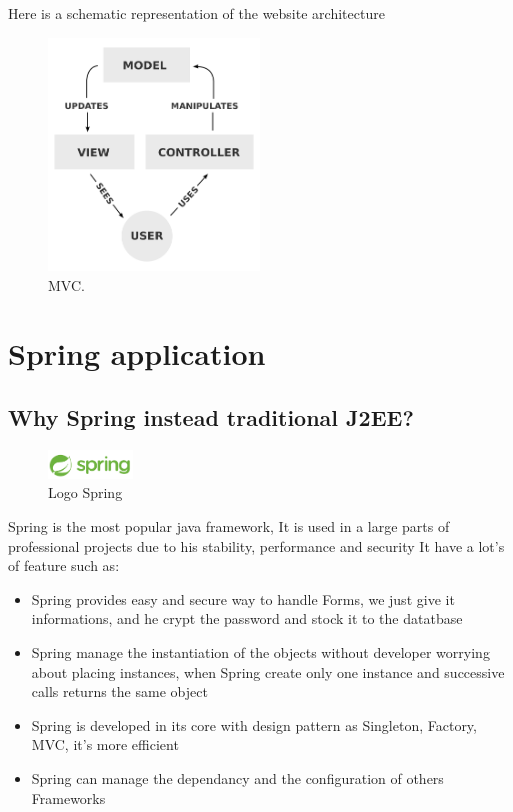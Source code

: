 Here is a schematic representation of the website architecture

\begin{figure}[!ht]
  \caption{MVC.}
  \centering
    \includegraphics[width=0.5\textwidth]{img/mvc.png}
\end{figure}


\section{Spring application}
\subsection{Why Spring instead traditional J2EE?}

\begin{figure}[H]
  \caption{Logo Spring}
  \centering
    \includegraphics[width=0.2\textwidth]{img/spring.png}
\end{figure}


Spring is the most popular java framework, It is used in a large parts of professional projects due to his stability, performance and security
It have a lot's of feature such as:

\begin{itemize}  
\item Spring provides easy and secure way to handle Forms, we just give it informations, and he crypt the password and stock it to the datatbase
\item Spring manage the instantiation of the objects without developer worrying about placing instances, when Spring create only one instance and successive calls returns the same object
\item Spring is developed in its core with design pattern as Singleton, Factory, MVC, it's more efficient
\item Spring can manage the dependancy and the configuration of others Frameworks
\end{itemize}  



